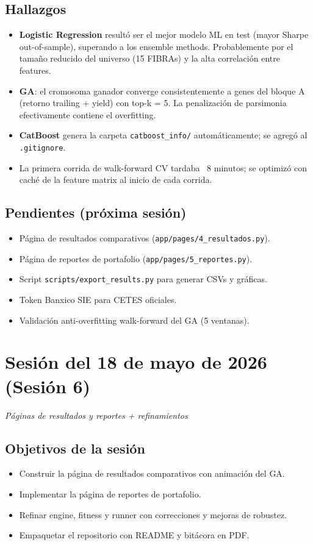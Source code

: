 \documentclass[12pt, a4paper]{article}
\newcommand{\sesion}[2]{%
  \section{Sesi\'{o}n del #1}%
  \textit{#2}%
  \vspace{0.5em}%
}
\begin{document}
\subsection{Hallazgos}
\begin{itemize}
  \item \textbf{Logistic Regression} result\'{o} ser el mejor modelo ML en test (mayor Sharpe out-of-sample), superando a los ensemble methods. Probablemente por el tama\~{n}o reducido del universo (15 FIBRAs) y la alta correlaci\'{o}n entre features.
  \item \textbf{GA}: el cromosoma ganador converge consistentemente a genes del bloque A (retorno trailing + yield) con top-k = 5. La penalizaci\'{o}n de parsimonia efectivamente contiene el overfitting.
  \item \textbf{CatBoost} genera la carpeta \texttt{catboost\_info/} autom\'{a}ticamente; se agreg\'{o} al \texttt{.gitignore}.
  \item La primera corrida de walk-forward CV tardaba ~8 minutos; se optimiz\'{o} con cach\'{e} de la feature matrix al inicio de cada corrida.
\end{itemize}

\subsection{Pendientes (pr\'{o}xima sesi\'{o}n)}
\begin{itemize}
  \item[$\boxtimes$] P\'{a}gina de resultados comparativos (\texttt{app/pages/4\_resultados.py}).
  \item[$\boxtimes$] P\'{a}gina de reportes de portafolio (\texttt{app/pages/5\_reportes.py}).
  \item[$\boxtimes$] Script \texttt{scripts/export\_results.py} para generar CSVs y gr\'{a}ficas.
  \item[$\square$] Token Banxico SIE para CETES oficiales.
  \item[$\square$] Validaci\'{o}n anti-overfitting walk-forward del GA (5 ventanas).
\end{itemize}

\newpage
\sesion{18 de mayo de 2026 (Sesi\'{o}n 6)}{P\'{a}ginas de resultados y reportes + refinamientos}

\subsection{Objetivos de la sesi\'{o}n}
\begin{itemize}
  \item Construir la p\'{a}gina de resultados comparativos con animaci\'{o}n del GA.
  \item Implementar la p\'{a}gina de reportes de portafolio.
  \item Refinar engine, fitness y runner con correcciones y mejoras de robustez.
  \item Empaquetar el repositorio con README y bit\'{a}cora en PDF.
\end{itemize}
\end{document}

